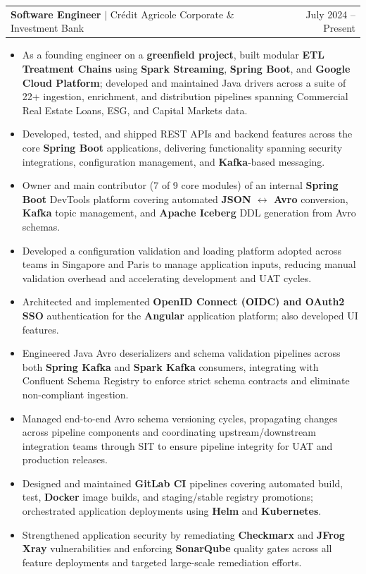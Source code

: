 \documentclass[letterpaper,10pt]{article}
\makeatletter
\newcommand{\resumeItem}[1]{
  \item\small{
    {#1 \vspace{-2pt}}
  }
}
\newcommand{\resumeProjectHeading}[2]{
    \item
    \begin{tabular*}{0.97\textwidth}{l@{\extracolsep{\fill}}r}
      \small#1 & #2 \\
    \end{tabular*}\vspace{-3pt}
}
\newcommand{\resumeItemListStart}{\begin{itemize}}
\newcommand{\resumeItemListEnd}{\end{itemize}\vspace{-5pt}}
\makeatother
\begin{document}
\resumeProjectHeading
      {\textbf{Software Engineer} $|$ \textnormal{Crédit Agricole Corporate \& Investment Bank}}{July 2024 -- Present}
      \resumeItemListStart
        \resumeItem{As a founding engineer on a \textbf{greenfield project}, built modular \textbf{ETL Treatment Chains} using \textbf{Spark Streaming}, \textbf{Spring Boot}, and \textbf{Google Cloud Platform}; developed and maintained Java drivers across a suite of 22+ ingestion, enrichment, and distribution pipelines spanning Commercial Real Estate Loans, ESG, and Capital Markets data.}
        \resumeItem{Developed, tested, and shipped REST APIs and backend features across the core \textbf{Spring Boot} applications, delivering functionality spanning security integrations, configuration management, and \textbf{Kafka}-based messaging.}
        \resumeItem{Owner and main contributor (7 of 9 core modules) of an internal \textbf{Spring Boot} DevTools platform covering automated \textbf{JSON $\leftrightarrow$ Avro} conversion, \textbf{Kafka} topic management, and \textbf{Apache Iceberg} DDL generation from Avro schemas.}
        \resumeItem{Developed a configuration validation and loading platform adopted across teams in Singapore and Paris to manage application inputs, reducing manual validation overhead and accelerating development and UAT cycles.}
        \resumeItem{Architected and implemented \textbf{OpenID Connect (OIDC) and OAuth2 SSO} authentication for the \textbf{Angular} application platform; also developed UI features.}
        \resumeItem{Engineered Java Avro deserializers and schema validation pipelines across both \textbf{Spring Kafka} and \textbf{Spark Kafka} consumers, integrating with Confluent Schema Registry to enforce strict schema contracts and eliminate non-compliant ingestion.}
        \resumeItem{Managed end-to-end Avro schema versioning cycles, propagating changes across pipeline components and coordinating upstream/downstream integration teams through SIT to ensure pipeline integrity for UAT and production releases.}
        \resumeItem{Designed and maintained \textbf{GitLab CI} pipelines covering automated build, test, \textbf{Docker} image builds, and staging/stable registry promotions; orchestrated application deployments using \textbf{Helm} and \textbf{Kubernetes}.}
        \resumeItem{Strengthened application security by remediating \textbf{Checkmarx} and \textbf{JFrog Xray} vulnerabilities and enforcing \textbf{SonarQube} quality gates across all feature deployments and targeted large-scale remediation efforts.}
      \resumeItemListEnd
      
\end{document}
